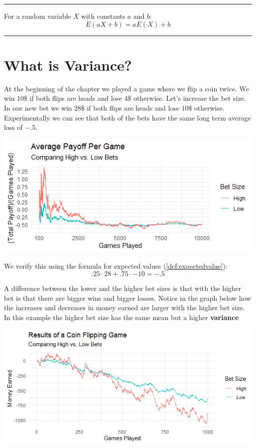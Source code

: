 \documentclass[
]{book}
\theoremstyle{definition}
\theoremstyle{definition}
\theoremstyle{definition}
\theoremstyle{remark}
\let\BeginKnitrBlock\begin \let\EndKnitrBlock\end
\begin{document}
\begin{center}\rule{0.5\linewidth}{0.5pt}\end{center}

\BeginKnitrBlock{theorem}[E(aX+b)]
\protect\hypertarget{thm:unnamed-chunk-15}{}{\label{thm:unnamed-chunk-15} {} }For a random variable \(X\) with constants \(a\) and \(b\):
\[E(aX+b) = aE(X)+b\]
\EndKnitrBlock{theorem}

\begin{center}\rule{0.5\linewidth}{0.5pt}\end{center}

\hypertarget{what-is-variance}{%
\section{What is Variance?}\label{what-is-variance}}

At the beginning of the chapter we played a game where we flip a coin twice. We win \(10\$\) if both flips are heads and lose \(4\$\) otherwise. Let's increase the bet size. In our new bet we win \(28\$\) if both flips are heads and lose \(10\$\) otherwise. Experimentally we can see that both of the bets have the same long term average loss of \(-.5\).

\includegraphics{Pictures/05-Expectations/highlowaveragepayoff.PNG}

We verify this using the formula for expected values (\ref{def:expectedvalue}):
\[.25 \cdot 28+.75 \cdot {-10}=-.5\]

A difference between the lower and the higher bet sizes is that with the higher bet is that there are bigger wins and bigger losses. Notice in the graph below how the increases and decreases in money earned are larger with the higher bet size. In this example the higher bet size has the same mean but a higher \textbf{variance}

\includegraphics{Pictures/05-Expectations/highlowbets.PNG}
\end{document}
